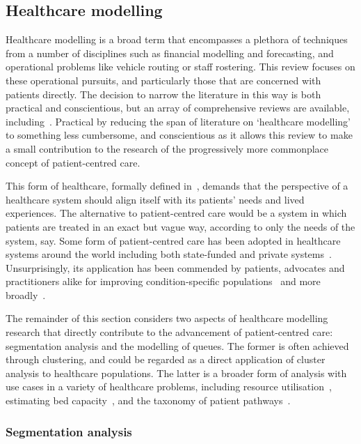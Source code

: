 \subsection{Healthcare modelling}\label{subsec:healthcare}

Healthcare modelling is a broad term that encompasses a plethora of techniques
from a number of disciplines such as financial modelling and forecasting, and
operational problems like vehicle routing or staff rostering. This review
focuses on these operational pursuits, and particularly those that are concerned
with patients directly. The decision to narrow the literature in this way is
both practical and conscientious, but an array of comprehensive reviews are
available, including~\cite{Brailsford2016,Galetsi2020,Kunc2018,Palmer2018}.
Practical by reducing the span of literature on `healthcare modelling' to
something less cumbersome, and conscientious as it allows this review to make a
small contribution to the research of the progressively more commonplace concept
of patient-centred care.

This form of healthcare, formally defined in~\cite{Robinson2008}, demands that
the perspective of a healthcare system should align itself with its patients'
needs and lived experiences. The alternative to patient-centred care would be a
system in which patients are treated in an exact but vague way, according to
only the needs of the system, say. Some form of patient-centred care has been
adopted in healthcare systems around the world including both state-funded and
private systems~\cite{DoH2010,Dewi2013,Luxford2011}. Unsurprisingly, its
application has been commended by patients, advocates and practitioners alike
for improving condition-specific
populations~\cite{Foster2019,Gambling2010,Gondek2016,Tsianakas2012} and more
broadly~\cite{IAPO2012,Richards2015,Santana2019}.

The remainder of this section considers two aspects of healthcare modelling
research that directly contribute to the advancement of patient-centred care:
segmentation analysis and the modelling of queues. The former is often achieved
through clustering, and could be regarded as a direct application of cluster
analysis to healthcare populations. The latter is a broader form of analysis
with use cases in a variety of healthcare problems, including resource
utilisation~\cite{Prokofyeva2020}, estimating bed capacity~\cite{Williams2015},
and the taxonomy of patient pathways~\cite{Rojas2016}.


\subsubsection{Segmentation analysis}


